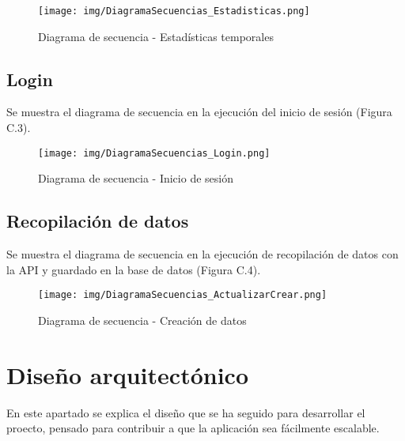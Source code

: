 \begin{figure}[h!]
    \centering
    \texttt{[image: img/DiagramaSecuencias\_Estadisticas.png]} \\
    \caption{Diagrama de secuencia - Estadísticas temporales}
    \label{Diagrama de secuencia - Estadísticas temporales}
\end{figure}

\subsection{Login}
Se muestra el diagrama de secuencia en la ejecución del inicio de sesión (Figura C.3).\\

\begin{figure}[h!]
    \centering
    \texttt{[image: img/DiagramaSecuencias\_Login.png]}\\
    \caption{Diagrama de secuencia - Inicio de sesión}
    \label{Diagrama de secuencia - Inicio de sesión}
\end{figure}


\subsection{Recopilación de datos}
Se muestra el diagrama de secuencia en la ejecución de recopilación de datos con la API y guardado en la base de datos (Figura C.4).\\


\begin{figure}[h!]
    \centering
    \texttt{[image: img/DiagramaSecuencias\_ActualizarCrear.png]} \\
    \caption{Diagrama de secuencia - Creación de datos}
    \label{Diagrama de secuencia - Creación de datos}
\end{figure}



\section{Diseño arquitectónico}
En este apartado se explica el diseño que se ha seguido para desarrollar el proecto, pensado para contribuir a que la aplicación sea fácilmente escalable.



